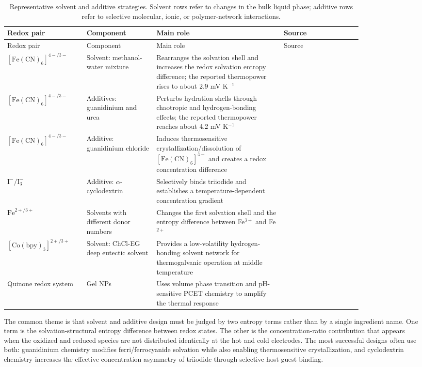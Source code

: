 \documentclass[a4paper,12pt]{report}
\begin{document}
\begin{longtable}{>{\raggedright\arraybackslash}p{0.18\linewidth}
>{\raggedright\arraybackslash}p{0.17\linewidth}
>{\raggedright\arraybackslash}p{0.31\linewidth}
>{\raggedright\arraybackslash}p{0.19\linewidth}}
\caption{Representative solvent and additive strategies. Solvent rows refer to
changes in the bulk liquid phase; additive rows refer to selective molecular,
ionic, or polymer-network interactions.}\\
\toprule
Redox pair & Component & Main role & Source \\
\midrule
\endfirsthead
\toprule
Redox pair & Component & Main role & Source \\
\midrule
\endhead
$[\mathrm{Fe(CN)}_6]^{4-/3-}$ & Solvent: methanol-water mixture & Rearranges the
solvation shell and increases the redox solvation entropy difference; the
reported thermopower rises to about 2.9 mV K$^{-1}$ & \citep{kim2017high} \\
$[\mathrm{Fe(CN)}_6]^{4-/3-}$ & Additives: guanidinium and urea & Perturbs hydration
shells through chaotropic and hydrogen-bonding effects; the reported
thermopower reaches about 4.2 mV K$^{-1}$ & \citep{duan2018aqueous} \\
$[\mathrm{Fe(CN)}_6]^{4-/3-}$ & Additive: guanidinium chloride & Induces
thermosensitive crystallization/dissolution of $[\mathrm{Fe(CN)}_6]^{4-}$ and
creates a redox concentration difference & \citep{yu2020thermosensitive} \\
$\mathrm{I}^{-}/\mathrm{I}_3^{-}$ & Additive: $\alpha$-cyclodextrin & Selectively binds
triiodide and establishes a temperature-dependent concentration gradient &
\citep{zhou2016supramolecular} \\
$\mathrm{Fe}^{2+/3+}$ & Solvents with different donor numbers &
Changes the first solvation shell and the entropy difference between
Fe$^{3+}$ and Fe$^{2+}$ & \citep{chen2023solvation} \\
$[\mathrm{Co(bpy)}_3]^{2+/3+}$ & Solvent: ChCl-EG deep eutectic solvent & Provides a
low-volatility hydrogen-bonding solvent network
for thermogalvanic operation at middle temperature & \citep{antariksa2021deep} \\
Quinone redox system & Gel NPs & Uses volume
phase transition and pH-sensitive PCET chemistry to amplify the thermal
response & \citep{guo2020nanoparticle} \\
\bottomrule
\end{longtable}

The common theme is that solvent and additive design must be judged by two
entropy terms rather than by a single ingredient name. One term is the
solvation-structural entropy difference between redox states. The other is the
concentration-ratio contribution that appears when the oxidized and reduced
species are not distributed identically at the hot and cold electrodes. The
most successful designs often use both: guanidinium chemistry modifies
ferri/ferrocyanide solvation while also enabling thermosensitive
crystallization, and cyclodextrin chemistry increases the effective
concentration asymmetry of triiodide through selective host-guest binding.
\end{document}
